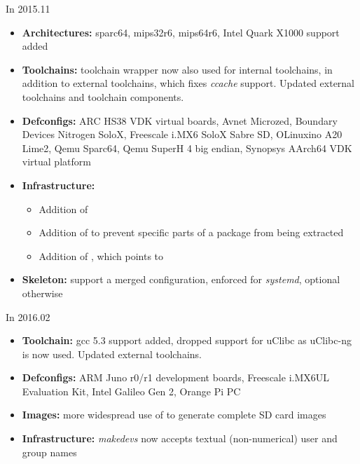 \begin{frame}{In 2015.11}
  \begin{itemize}
  \item {\bf Architectures:} sparc64, mips32r6, mips64r6, Intel Quark
    X1000 support added
  \item {\bf Toolchains:} toolchain wrapper now also used for internal
    toolchains, in addition to external toolchains, which fixes {\em
      ccache} support. Updated external toolchains and toolchain
    components.
  \item {\bf Defconfigs:} ARC HS38 VDK virtual boards, Avnet Microzed,
    Boundary Devices Nitrogen SoloX, Freescale i.MX6 SoloX Sabre SD,
    OLinuxino A20 Lime2, Qemu Sparc64, Qemu SuperH 4 big endian,
    Synopsys AArch64 VDK virtual platform
  \item {\bf Infrastructure:}
    \begin{itemize}
    \item Addition of 
    \item Addition of  to prevent specific parts
      of a package from being extracted
    \item Addition of , which points to
    \end{itemize}
  \item {\bf Skeleton:} support a merged  configuration,
    enforced for {\em systemd}, optional otherwise
  \end{itemize}
\end{frame}

\begin{frame}{In 2016.02}
  \begin{itemize}
  \item {\bf Toolchain:} gcc 5.3 support added, dropped support for
    uClibc as uClibc-ng is now used. Updated external toolchains.
  \item {\bf Defconfigs:} ARM Juno r0/r1 development boards, Freescale
    i.MX6UL Evaluation Kit, Intel Galileo Gen 2, Orange Pi PC
  \item {\bf Images:} more widespread use of  to
    generate complete SD card images
  \item {\bf Infrastructure:} {\em makedevs} now accepts textual
    (non-numerical) user and group names
  \end{itemize}
\end{frame}

